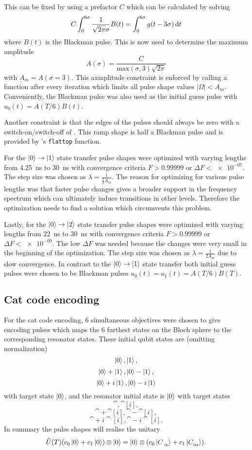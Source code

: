 \documentclass[main.tex]{subfiles}
\begin{document}
This can be fixed by using a prefactor \(C\) which can be calculated by solving
\begin{equation}
    C \int_0^{6\sigma}\frac{1}{\sqrt{2\pi}\sigma} B(t) = \int_0^{6\sigma}g(t-3\sigma)\,\mathrm{d} t
\end{equation}
where \(B(t)\) is the Blackman pulse.
This is now used to determine the maximum amplitude
\begin{equation}
    A(\sigma) = \frac{C}{\text{max}(\sigma,3)\sqrt{2\pi}}
\end{equation}
with \(A_m = A(\sigma = 3)\). 
This axmplitude constraint is enforced by calling a function after every iteration which limits all pulse shape values \(|\Omega| < A_m\).
Conveniently, the Blackman pulse was also used as the initial guess pulse with \(u_0(t) = A(T/6)B(t)\).

Another constraint is that the edges of the pulses should always be zero with a switch-on/switch-off of .
This ramp shape is half a Blackman pulse and is provided by \krotov{}'s \texttt{flattop} function.

For the \(\ket{0}\rightarrow\ket{1}\) state transfer pulse shapes were optimized with varying lengths from \SI{4.25}{\nano\second} to \SI{30}{\nano\second} with convergence criteria \(F>0.99999\) or \(\Delta F < \num{e-07}\).
The step size was chosen as \(\lambda = \frac{1}{\frac{1}{2}A_{m}}\).
The reason for optimizing for various pulse lengths was that faster pulse changes gives a broader support in the frequency spectrum which can ultimately induce transitions in other levels.
Therefore the optimization needs to find a solution which circumvents this problem.

Lastly, for the \(\ket{0}\rightarrow\ket{2}\) state transfer pulse shapes were optimized with varying lengths from \SI{22}{\nano\second} to \SI{30}{\nano\second} with convergence criteria \(F>0.99999\) or \(\Delta F < \num{e-09}\).
The low \(\Delta F\) was needed because the changes were very small in the beginning of the optimization.
The step size was chosen as \(\lambda = \frac{1}{2A_{m}}\) due to slow convergence.
In contrast to the \(\ket{0}\rightarrow\ket{1}\) state transfer both initial guess pulses were chosen to be Blackman pulses \(u_0(t) = u_1(t) = A(T/6)B(T)\).

\subsection{Cat code encoding}
For the cat code encoding, 6 simultaneous objectives were chosen to give encoding pulses which maps the 6 furthest states on the Bloch sphere to the corresponding resonator states.
These initial qubit states are (omitting normalization)
\[ \ket{0}, \ket{1},\]
\[ \ket{0}+\ket{1}, \ket{0}-\ket{1},\]
\[ \ket{0}+i\ket{1}, \ket{0}-i\ket{1} \]
with target state \(\ket{0}\),
and the resonator initial state is \(\ket{0}\) with target states
\[ \cat{}, \cat[i]{},\]
\[ \cat{}+\cat[i]{}, \cat{}-\cat[i]{},\]
\[ \cat{}+i\cat[i]{}, \cat{}-i\cat[i]{}. \]
In summary the pulse shapes will realise the unitary
\begin{equation}
    \hat{U}(T) \qty(c_0\ket{0}+c_1\ket{0})\otimes\ket{0} = \ket{0}\otimes\qty(c_0\cat{}+c_1\cat[i]{}).
\end{equation}
\end{document}
